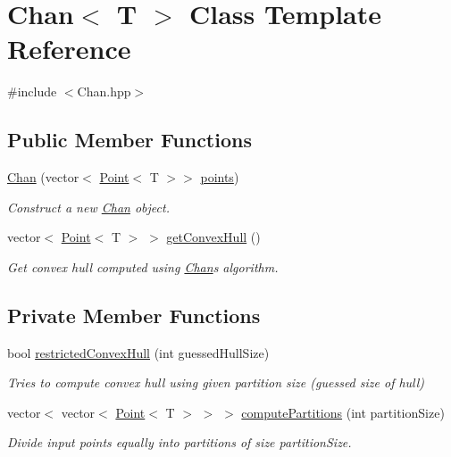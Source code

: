 \hypertarget{classChan}{}\section{Chan$<$ T $>$ Class Template Reference}
\label{classChan}


{\ttfamily \#include $<$Chan.\+hpp$>$}

\subsection*{Public Member Functions}
\begin{DoxyCompactItemize}
\item 
\mbox{\hyperlink{classChan_ac5b684c05344e32e6ec76d781b676634}{Chan}} (vector$<$ \mbox{\hyperlink{classPoint}{Point}}$<$ T $>$$>$ \mbox{\hyperlink{classChan_a492d7e3f31f1fd1e06f5ff464eec0492}{points}})
\begin{DoxyCompactList}\small\item\em Construct a new \mbox{\hyperlink{classChan}{Chan}} object. \end{DoxyCompactList}\item 
vector$<$ \mbox{\hyperlink{classPoint}{Point}}$<$ T $>$ $>$ \mbox{\hyperlink{classChan_a3cfcc1c908e1b4fde9bddb33d1af6d65}{get\+Convex\+Hull}} ()
\begin{DoxyCompactList}\small\item\em Get convex hull computed using \mbox{\hyperlink{classChan}{Chan}}\textquotesingle{}s algorithm. \end{DoxyCompactList}\end{DoxyCompactItemize}
\subsection*{Private Member Functions}
\begin{DoxyCompactItemize}
\item 
bool \mbox{\hyperlink{classChan_a773b2ebe27132ccfacedd5efebd63093}{restricted\+Convex\+Hull}} (int guessed\+Hull\+Size)
\begin{DoxyCompactList}\small\item\em Tries to compute convex hull using given partition size (guessed size of hull) \end{DoxyCompactList}\item 
vector$<$ vector$<$ \mbox{\hyperlink{classPoint}{Point}}$<$ T $>$ $>$ $>$ \mbox{\hyperlink{classChan_a6c42d1c1eab98ab7fb9a3a851f51f305}{compute\+Partitions}} (int partition\+Size)
\begin{DoxyCompactList}\small\item\em Divide input points equally into partitions of size \textquotesingle{}partition\+Size\textquotesingle{}. \end{DoxyCompactList}\end{DoxyCompactItemize}
